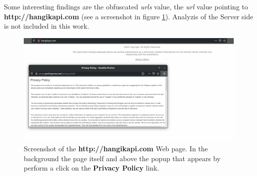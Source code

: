 \documentclass[10pt,titlepage]{article}
\begin{document}
Some interesting findings are the obfuscated \textit{urls} value, the \textit{url} value pointing to \textbf{http://hangikapi.com} (see a screenshot in figure \ref{fig:hangikapiscreenshot}).
Analyzis of the Server side is not included in this work.

\begin{figure}[H]
  \begin{center}
  \includegraphics[width=\linewidth]{hangikapicom.png}
  \end{center}
  \caption{Screenshot of the \textbf{http://hangikapi.com} Web page. In the background the page itself and above the popup that appears by perform a click on the \textbf{Privacy Policy} link.}
  \label{fig:hangikapiscreenshot}
\end{figure}
\end{document}

